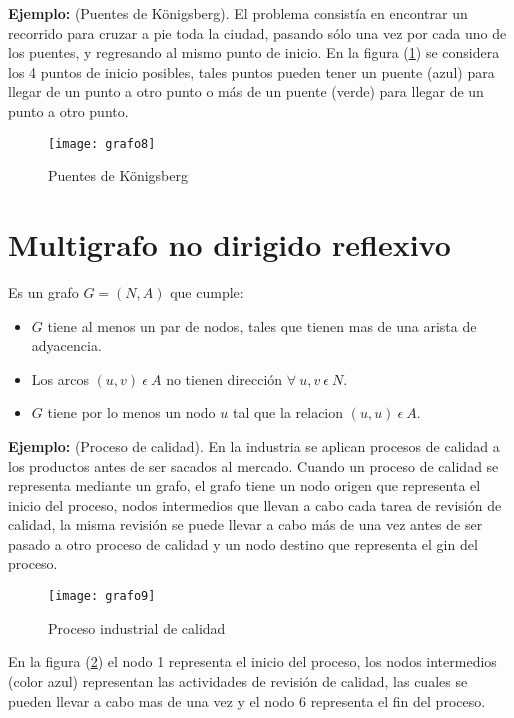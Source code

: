 \documentclass[a4paper, 11pt]{article}
\begin{document}
\textbf{Ejemplo:} (Puentes de Königsberg). El problema consistía en encontrar un recorrido para cruzar a pie toda la ciudad, pasando sólo una vez por cada uno de los puentes, y regresando al mismo punto de inicio.  En la figura (\ref{imagen8}) se considera los 4 puntos de inicio posibles, tales puntos pueden tener un puente (azul) para llegar de un punto a otro punto o más de un puente (verde) para llegar de un punto a otro punto.


\begin{figure}[H]
  \centering
    \texttt{[image: grafo8]}
  \caption{Puentes de Königsberg}
  \label{imagen8}
\end{figure}




\section*{Multigrafo no dirigido reflexivo }


Es un grafo $G = (N, A)$ que cumple:
\begin{itemize}
\item $G$ tiene al menos un par de nodos, tales que tienen mas de una arista de adyacencia.
\item Los arcos $(u, v) \ \epsilon \ A$ no tienen dirección $\forall \ u, v \ \epsilon \ N$.
\item $G$ tiene por lo menos un nodo $u$ tal que la relacion $(u, u) \ \epsilon \ A$.
\end{itemize}


\textbf{Ejemplo:} (Proceso de calidad). En la industria se aplican procesos de calidad a los productos antes de ser sacados al mercado. Cuando un proceso de calidad se representa mediante un grafo, el grafo tiene un nodo origen que representa el inicio del proceso, nodos intermedios que llevan a cabo cada tarea de revisión de calidad, la misma revisión se puede llevar a cabo más de una vez antes de ser pasado a otro proceso de calidad y un nodo destino que representa el gin del proceso.


\begin{figure}[H]
  \centering
    \texttt{[image: grafo9]}
  \caption{Proceso industrial de calidad}
  \label{imagen9}
\end{figure}

En la figura (\ref{imagen9}) el nodo 1 representa el inicio del proceso, los nodos intermedios (color azul) representan las actividades de revisión de calidad, las cuales se pueden llevar a cabo mas de una vez y el nodo 6 representa el fin del proceso.
\end{document}
